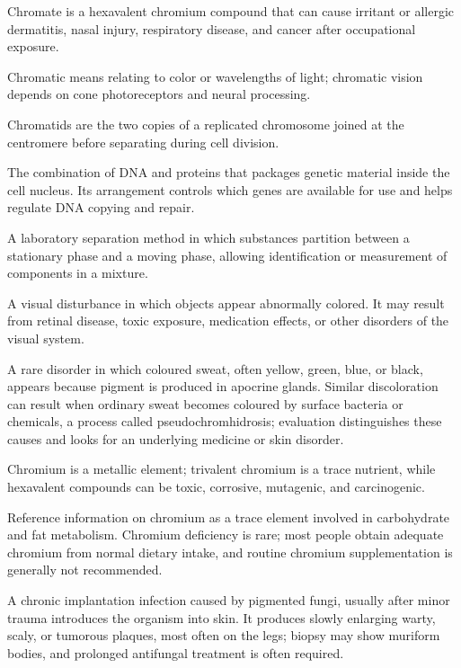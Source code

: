  Chromate is a hexavalent chromium compound that can cause irritant or allergic dermatitis, nasal injury, respiratory disease, and cancer after occupational exposure.

 Chromatic means relating to color or wavelengths of light; chromatic vision depends on cone photoreceptors and neural processing.

 Chromatids are the two copies of a replicated chromosome joined at the centromere before separating during cell division.

 The combination of DNA and proteins that packages genetic material inside the cell nucleus. Its arrangement controls which genes are available for use and helps regulate DNA copying and repair.

 A laboratory separation method in which substances partition between a stationary phase and a moving phase, allowing identification or measurement of components in a mixture.

 A visual disturbance in which objects appear abnormally colored. It may result from
retinal disease, toxic exposure, medication effects, or other disorders of the visual
system.

 A rare disorder in which coloured sweat, often yellow, green, blue, or black, appears because pigment is produced in apocrine glands. Similar discoloration can result when ordinary sweat becomes coloured by surface bacteria or chemicals, a process called pseudochromhidrosis; evaluation distinguishes these causes and looks for an underlying medicine or skin disorder.

 Chromium is a metallic element; trivalent chromium is a trace nutrient, while hexavalent compounds can be toxic, corrosive, mutagenic, and carcinogenic.

 Reference information on chromium as a trace element involved in carbohydrate and fat metabolism. Chromium deficiency is rare; most people obtain adequate chromium from normal dietary intake, and routine chromium supplementation is generally not recommended.

 A chronic implantation infection caused by pigmented fungi, usually after minor trauma introduces the organism into skin. It produces slowly enlarging warty, scaly, or tumorous plaques, most often on the legs; biopsy may show muriform bodies, and prolonged antifungal treatment is often required.

